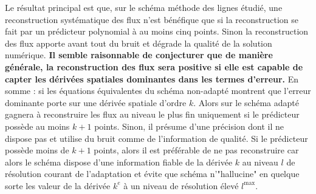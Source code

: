 Le résultat principal est que, sur le schéma méthode des lignes étudié, une reconstruction systématique des flux n'est bénéfique que si la reconstruction se fait par un
prédicteur polynomial à au moins cinq points. Sinon la reconstruction des flux apporte avant tout du bruit et dégrade la qualité de la solution numérique.
\textbf{Il semble raisonnable de conjecturer que de manière générale, la reconstruction des flux sera positive si elle est capable de capter les dérivées spatiales dominantes dans les termes d'erreur.}
En somme : si les équations équivalentes du schéma non-adapté montrent que l'erreur dominante porte sur une dérivée spatiale d'ordre $k$. 
Alors sur le schéma adapté gagnera à reconstruire les flux au niveau le plus fin uniquement si le prédicteur possède au moins $k+1$ points.
Sinon, il présume d'une précision dont il ne dispose pas et utilise du bruit comme de l'information de qualité. Si le prédicteur 
possède moins de $k+1$ points, alors il est préférable de ne pas reconstruire car alors le schéma dispose d'une 
information fiable de la dérivée $k$ au niveau $l$ de résolution courant de l'adaptation et évite que schéma n'"hallucine" en quelque sorte les 
valeur de la dérivée $k^e$ à un niveau de résolution élevé $l^{\max}$.